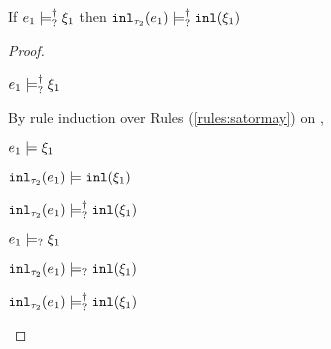 \begin{lem}
  \label{lem:satormay-inl}
  If $e_1 \models_{?}^{\dag} \xi_1$ then $\mathtt{inl}_{\tau_2}({e_1}) \models_{?}^{\dag} \mathtt{inl}(\xi_1)$
\end{lem}
\begin{proof}
  \begin{pfsteps*}
  \item $e_1 \models_{?}^{\dag} \xi_1$  
  \end{pfsteps*}
  By rule induction over Rules (\ref{rules:satormay}) on ,
  \begin{byCases}

  \item[\text{(\ref{rule:CSMSSat})}]
    \begin{pfsteps*}
    \item $e_1 \models \xi_1$  
    \item $\mathtt{inl}_{\tau_2}({e_1}) \models \mathtt{inl}(\xi_1)$  
    \item $\mathtt{inl}_{\tau_2}({e_1}) \models_{?}^{\dag} \mathtt{inl}(\xi_1)$ 
    \end{pfsteps*}


  \item[\text{(\ref{rule:CSMSMay})}]
    \begin{pfsteps*}
    \item $e_1 \models_{?} \xi_1$  
    \item $\mathtt{inl}_{\tau_2}({e_1}) \models_{?} \mathtt{inl}(\xi_1)$  
    \item $\mathtt{inl}_{\tau_2}({e_1}) \models_{?}^{\dag} \mathtt{inl}(\xi_1)$ 
    \end{pfsteps*}
  \end{byCases}
  \resetpfcounter
\end{proof}

